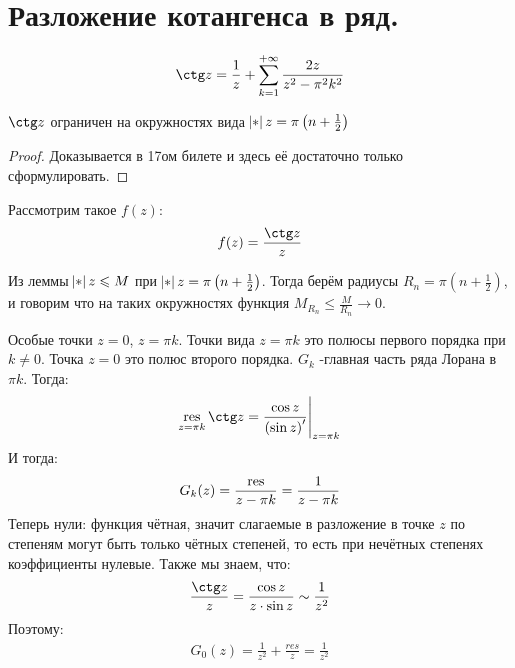 \section{Разложение котангенса в ряд.}
\begin{example}
    \begin{gather*}
        \ctg z = \frac{1}{z} + \sum_{k=1}^{+\infty} \frac{2z}{z^2-\pi^2k^2}
    \end{gather*}
\end{example}

\begin{lemma}
    $\ctg z$ ограничен на окружностях вида $\abs{z} = \pi\left(n + \frac12\right)$
\end{lemma}

\begin{proof}

    Доказывается в 17ом билете и здесь её достаточно только сформулировать.
    
\end{proof}

Рассмотрим такое $f(z)$:
\begin{gather*}
    f(z) = \frac{\ctg z}{z}
\end{gather*}

Из леммы $\abs{z} \le M$ при $\abs{z} = \pi\left(n + \frac12\right)$. Тогда берём радиусы $R_n = \pi\left(n + \frac12\right)$, и говорим что на таких окружностях функция $M_{R_n} \le \frac{M}{R_n} \to 0$.

Особые точки $z = 0$, $z = \pi k$. Точки вида $z = \pi k$ это полюсы первого порядка при $k \neq 0$. Точка $z = 0$ это полюс второго порядка. $G_k$ -главная часть ряда Лорана в $\pi k$. Тогда: 
\begin{gather*}
    \res\limits_{z=\pi k} \ctg z = \eval{\frac{\cos z}{\left( \sin z \right)'}}_{z=\pi k}
\end{gather*}
И тогда:
\begin{gather*}
    G_k(z) = \frac{\operatorname*{res}}{z-\pi k} = \frac{1}{z-\pi k}
\end{gather*}
Теперь нули: функция чётная, значит слагаемые в разложение в точке $z$ по степеням могут быть только чётных степеней, то есть при нечётных степенях коэффициенты нулевые. Также мы знаем, что:
\begin{gather*}
    \frac{\ctg z}{z} = \frac{\cos z}{z \cdot \sin z} \sim \frac{1}{z^2}
\end{gather*} 
Поэтому: 
\begin{gather*}
    G_0(z) = \frac{1}{z^2} + \frac{res}{z}= \frac{1}{z^2}
\end{gather*}

